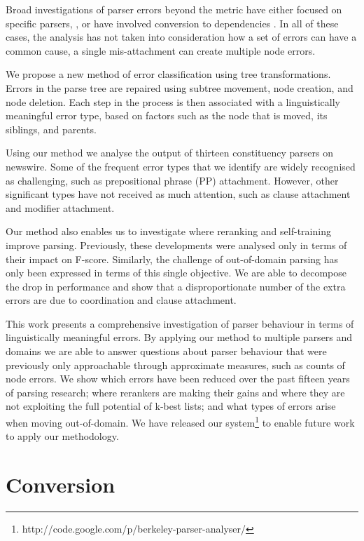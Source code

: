 Broad investigations of parser errors beyond the \parseval metric
\parencite{Black-etal:1991} have either focused on specific parsers, \eg
\parencite{Collins:2003}, or have involved conversion to dependencies
\parencite{Carroll-etal:1998,King:2003}.  In all of these cases, the analysis has
not taken into consideration how a set of errors can have a common cause, \eg a
single mis-attachment can create multiple node errors.

We propose a new method of error classification using tree transformations.
Errors in the parse tree are repaired using subtree movement, node
creation, and node deletion.  Each step in the process is then associated with
a linguistically meaningful error type, based on factors such as the node that is
moved, its siblings, and parents.  

Using our method we analyse the output of thirteen constituency parsers on
newswire.  Some of the frequent error types that we identify are widely recognised
as challenging, such as prepositional phrase (PP) attachment.  However, other
significant types have not received as much attention, such as clause
attachment and modifier attachment.

Our method also enables us to investigate where reranking and self-training
improve parsing.  Previously, these developments were analysed only in terms of
their impact on F-score.  Similarly, the challenge of out-of-domain parsing has
only been expressed in terms of this single objective.  We are able to
decompose the drop in performance and show that a disproportionate number of
the extra errors are due to coordination and clause attachment.

This work presents a comprehensive investigation of parser behaviour in terms
of linguistically meaningful errors.  By applying our method to multiple
parsers and domains we are able to answer questions about parser behaviour that
were previously only approachable through approximate measures, such as counts
of node errors.  We show which errors have been reduced over the past fifteen
years of parsing research; where rerankers are making their gains and where
they are not exploiting the full potential of k-best lists; and what types of
errors arise when moving out-of-domain.  We have released our
system\footnote{http://code.google.com/p/berkeley-parser-analyser/} to enable
future work to apply our methodology.

\section{Conversion}

